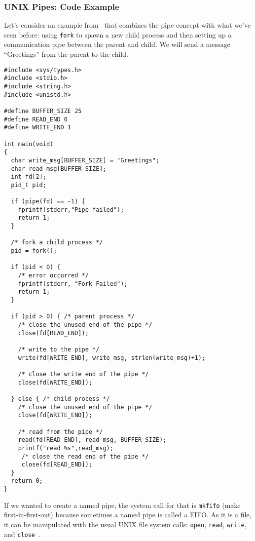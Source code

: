 \subsubsection*{UNIX Pipes: Code Example}

Let's consider an example from~\cite{osc} that combines the pipe concept with what we've seen before: using \texttt{fork} to spawn a new child process and then setting up a communication pipe between the parent and child. We will send a message ``Greetings'' from the parent to the child.

\begin{verbatim}
#include <sys/types.h> 
#include <stdio.h> 
#include <string.h> 
#include <unistd.h>

#define BUFFER_SIZE 25
#define READ_END 0 
#define WRITE_END 1

int main(void)
{
  char write_msg[BUFFER_SIZE] = "Greetings"; 
  char read_msg[BUFFER_SIZE];
  int fd[2];
  pid_t pid;

  if (pipe(fd) == -1) {
    fprintf(stderr,"Pipe failed");
    return 1;
  }
  
  /* fork a child process */
  pid = fork();
  
  if (pid < 0) { 
    /* error occurred */ 
    fprintf(stderr, "Fork Failed"); 
    return 1;
  }

  if (pid > 0) { /* parent process */
    /* close the unused end of the pipe */ 
    close(fd[READ_END]);
    
    /* write to the pipe */
    write(fd[WRITE_END], write_msg, strlen(write_msg)+1);
    
    /* close the write end of the pipe */
    close(fd[WRITE_END]);
    
  } else { /* child process */
    /* close the unused end of the pipe */ 
    close(fd[WRITE_END]);
    
    /* read from the pipe */
    read(fd[READ_END], read_msg, BUFFER_SIZE); 
    printf("read %s",read_msg);
     /* close the read end of the pipe */
     close(fd[READ_END]);
  }
  return 0;
}
\end{verbatim}

If we wanted to create a named pipe, the system call for that is \texttt{mkfifo} (make first-in-first-out) because sometimes a named pipe is called a FIFO. As it is a file, it can be manipulated with the usual UNIX file system calls: \texttt{open}, \texttt{read}, \texttt{write}, and \texttt{close}~\cite{osc}.




